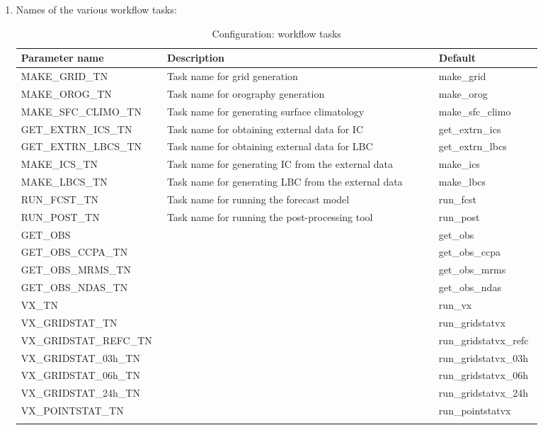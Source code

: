 \documentclass[11pt,fleqn]{report}              %
\begin{document}
\begin{enumerate}
\item Names of the various workflow tasks:
{
\scriptsize
\begin{longtable}{ p{0.22\linewidth} | p{0.5\linewidth} | p{0.16\linewidth}}
\hline
\hline
 Parameter name & Description & Default \\
\hline
MAKE\_GRID\_TN & Task name for grid generation & make\_grid \\
MAKE\_OROG\_TN & Task name for orography generation & make\_orog \\
MAKE\_SFC\_CLIMO\_TN & Task name for generating surface climatology & make\_sfc\_climo \\
GET\_EXTRN\_ICS\_TN & Task name for obtaining external data for IC & get\_extrn\_ics \\
GET\_EXTRN\_LBCS\_TN & Task name for obtaining external data for LBC & get\_extrn\_lbcs \\
MAKE\_ICS\_TN & Task name for generating IC from the external data & make\_ics \\
MAKE\_LBCS\_TN & Task name for generating LBC from the external data & make\_lbcs \\
RUN\_FCST\_TN & Task name for running the forecast model & run\_fcst \\
RUN\_POST\_TN & Task name for running the post-processing tool & run\_post \\
GET\_OBS & & get\_obs \\
GET\_OBS\_CCPA\_TN & & get\_obs\_ccpa \\
GET\_OBS\_MRMS\_TN & & get\_obs\_mrms \\
GET\_OBS\_NDAS\_TN & & get\_obs\_ndas \\
VX\_TN & & run\_vx \\
VX\_GRIDSTAT\_TN & & run\_gridstatvx \\
VX\_GRIDSTAT\_REFC\_TN & & run\_gridstatvx\_refc \\
VX\_GRIDSTAT\_03h\_TN & & run\_gridstatvx\_03h \\
VX\_GRIDSTAT\_06h\_TN & & run\_gridstatvx\_06h \\
VX\_GRIDSTAT\_24h\_TN & & run\_gridstatvx\_24h \\
VX\_POINTSTAT\_TN & & run\_pointstatvx \\
\hline
\caption{Configuration: workflow tasks}
\label{table:config_wflow_task}
\end{longtable}
}


\end{enumerate}
\end{document}

